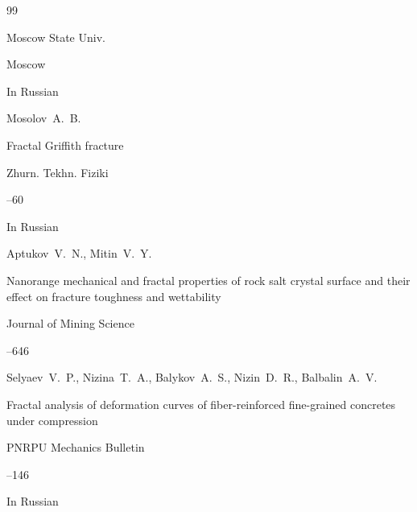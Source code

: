 \begin{thebibliography}{99}

\publ  Moscow State Univ.

\publaddr Moscow

\lang In Russian







\by Mosolov~A.~B.

\paper Fractal Griffith fracture

\jour  Zhurn. Tekhn. Fiziki




--60

\lang In Russian






\by Aptukov~V.~N., Mitin~V.~Y.

\paper Nanorange mechanical and fractal properties of rock salt crystal surface and their effect on fracture toughness and wettability

\jour Journal of Mining Science 




--646









\by Selyaev~V.~P., Nizina~T.~A., Balykov~A.~S., Nizin~D.~R., Balbalin~A.~V.

\paper Fractal analysis of deformation curves of fiber-reinforced fine-grained concretes under compression

\jour PNRPU Mechanics Bulletin



--146

\lang In Russian







\end{thebibliography}
